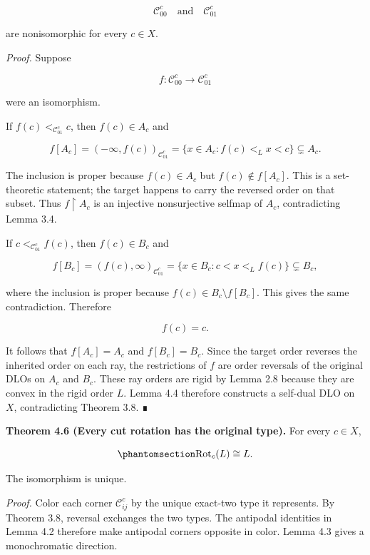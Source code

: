 \documentclass[
  english,
  11pt,
  reqno]{amsart}
\begin{document}
\[
\mathcal C_{00}^c
\quad\text{and}\quad
\mathcal C_{01}^c
\]

are nonisomorphic for every \(c\in X\).

\emph{Proof.} Suppose

\[
f:\mathcal C_{00}^c\longrightarrow\mathcal C_{01}^c
\]

were an isomorphism.

If \(f(c)<_{\mathcal C_{01}^c}c\), then \(f(c)\in A_c\) and

\[
f[A_c]
=
(-\infty,f(c))_{\mathcal C_{01}^c}
=
\{x\in A_c:f(c)<_Lx<c\}
\subsetneq
A_c.
\]

The inclusion is proper because \(f(c)\in A_c\) but
\(f(c)\notin f[A_c]\). This is a set-theoretic statement; the target
happens to carry the reversed order on that subset. Thus
\(f\upharpoonright A_c\) is an injective nonsurjective selfmap of
\(A_c\), contradicting Lemma 3.4.

If \(c<_{\mathcal C_{01}^c}f(c)\), then \(f(c)\in B_c\) and

\[
f[B_c]
=
(f(c),\infty)_{\mathcal C_{01}^c}
=
\{x\in B_c:c<x<_L f(c)\}
\subsetneq
B_c,
\]

where the inclusion is proper because \(f(c)\in B_c\setminus f[B_c]\).
This gives the same contradiction. Therefore

\[
f(c)=c.
\]

It follows that \(f[A_c]=A_c\) and \(f[B_c]=B_c\). Since the target
order reverses the inherited order on each ray, the restrictions of
\(f\) are order reversals of the original DLOs on \(A_c\) and \(B_c\).
These ray orders are rigid by Lemma 2.8 because they are convex in the
rigid order \(L\). Lemma 4.4 therefore constructs a self-dual DLO on
\(X\), contradicting Theorem 3.8. ∎

\protect{}\label{thm:4-6-cut-rotation-type}

\textbf{Theorem 4.6 (Every cut rotation has the original type).} For
every \(c\in X\),

\begin{equation}\protect\phantomsection\label{eq:all-cut-rotations}{
\operatorname{Rot}_c(L)
\cong
L.
}\end{equation}

The isomorphism is unique.

\emph{Proof.} Color each corner \(\mathcal C_{ij}^c\) by the unique
exact-two type it represents. By Theorem 3.8, reversal exchanges the two
types. The antipodal identities in Lemma 4.2 therefore make antipodal
corners opposite in color. Lemma 4.3 gives a monochromatic direction.
\end{document}
